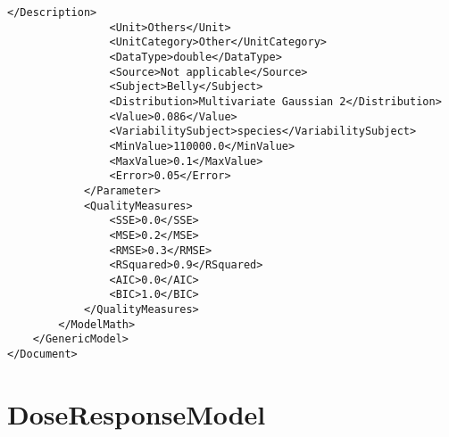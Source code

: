 \begin{lstlisting}[language=RAKIP, caption={Example of GenericModel}]
                </Description>
                <Unit>Others</Unit>
                <UnitCategory>Other</UnitCategory>
                <DataType>double</DataType>
                <Source>Not applicable</Source>
                <Subject>Belly</Subject>
                <Distribution>Multivariate Gaussian 2</Distribution>
                <Value>0.086</Value>
                <VariabilitySubject>species</VariabilitySubject>
                <MinValue>110000.0</MinValue>
                <MaxValue>0.1</MaxValue>
                <Error>0.05</Error>
            </Parameter>
            <QualityMeasures>
                <SSE>0.0</SSE>
                <MSE>0.2</MSE>
                <RMSE>0.3</RMSE>
                <RSquared>0.9</RSquared>
                <AIC>0.0</AIC>
                <BIC>1.0</BIC>
            </QualityMeasures>
        </ModelMath>
    </GenericModel>
</Document>    
\end{lstlisting}

\section{DoseResponseModel}

